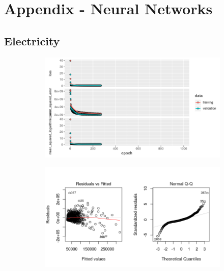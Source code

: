 \section*{Appendix - Neural Networks}
\label{sec:appendix_nn}
\appendix
\subsection{Electricity}
\label{appendix_nn:electricity:nn_full}
\begin{figure}[h]
\begin{subfigure}{1\textwidth}
\centering
\includegraphics[width=.99\textwidth, height=0.4\textheight]{Images/electricity_psf_nn_full_train_results.png}
\end{subfigure}
\begin{subfigure}{1\textwidth}
\centering
\includegraphics[width=.99\textwidth, height=0.3\textheight]{Images/electricity_psf_nn_full_resid_1.png}
\end{subfigure}
\end{figure}
\newpage
